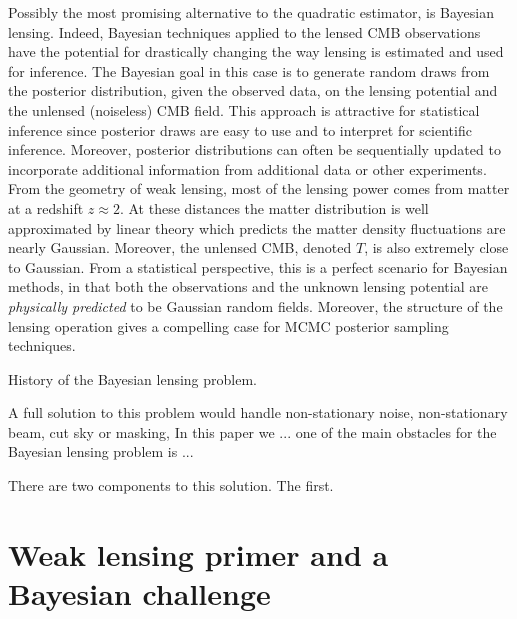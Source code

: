 \documentclass[noinfoline]{imsart}
\begin{document}
 Possibly the most promising alternative to the quadratic estimator, is Bayesian lensing. Indeed, Bayesian techniques applied to the lensed CMB observations have the potential for drastically changing the way lensing is estimated and used for inference. The Bayesian goal in this case is to generate random draws from the posterior distribution, given the observed data, on the lensing potential and the unlensed (noiseless) CMB field. This approach is attractive for statistical inference since posterior draws are easy to use and to interpret for scientific inference. Moreover, posterior distributions can often be sequentially updated to incorporate additional information from additional data or other experiments.
 From the geometry of weak lensing, most of the lensing power comes from matter at a redshift $z\approx 2$. At these distances the matter distribution is well approximated by linear theory which predicts the matter density fluctuations are nearly Gaussian. Moreover, the unlensed CMB, denoted  $T$, is also extremely close to Gaussian.  From a statistical perspective, this is a perfect scenario for Bayesian methods, in that both the observations and the unknown lensing potential are {\em physically predicted} to be Gaussian random fields.  Moreover, the structure of the lensing operation gives a compelling case for MCMC posterior sampling techniques.
 


History of the Bayesian lensing problem.

A full solution to this problem would handle non-stationary noise, non-stationary beam, cut sky or masking, In this paper we ... one of the main obstacles for the Bayesian lensing problem is ...

There are two components to this solution. The first.

%
%
\section{Weak lensing primer and a Bayesian challenge}
\label{primer}
\end{document}
